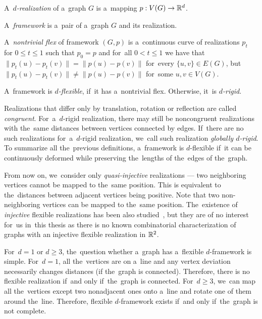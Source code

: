 %
\begin{definition}[\( d \)-realization]
	A~\emph{\( d \)-realization} of a~graph \( G \) is a~mapping \( p: V(G) \to \mathbb{R}^d \).
\end{definition}
%
\begin{definition}[Framework]
	A~\emph{framework} is a~pair of a~graph \( G \) and its realization.
\end{definition}
%
\begin{definition}
	A~\emph{nontrivial flex} of framework \( (G, p) \) is a~continuous curve of realizations \( p_t \)
	for \( 0 \le t \le 1\) such that
	\( p_0 = p \) and for~all \( 0 < t \le 1 \)
	we have that
	\( \|p_t(u) - p_t(v)\| = \|p(u) - p(v)\|\) for~every \( \{u, v\} \in E(G) \),
	but \( \|p_t(u) - p_t(v)\| \ne \|p(u) - p(v)\| \) for~some \( u, v \in V (G) \).
\end{definition}
%
\begin{definition}
	A~framework is \emph{\( d \)-flexible}, if~it has a~nontrivial flex.
	Otherwise, it~is \emph{\( d \)-rigid}.
\end{definition}
%
Realizations that differ only by translation,
rotation or reflection are called \emph{congruent}.
%
For~a~\( d \)-rigid realization, there may still be noncongruent realizations
with the~same distances between vertices connected by edges.
%
If~there are no such realizations for~a~\( d \)-rigid realization,
we~call such realization \emph{globally \( d \)-rigid}.
To summarize all the~previous definitions,
a~framework is \( d \)-flexible if~it can be continuously deformed
while preserving the~lengths of the~edges of the~graph.

From now on, we~consider only \emph{quasi-injective} realizations ---
two neighboring vertices cannot be mapped to the~same position.
This is equivalent to the~distances between adjacent vertices being positive.
Note that two non-neighboring vertices can be mapped to the~same position.
The~existence of \emph{injective} flexible realizations
has been also studied~\cite{injective_realizations},
but they are of no interest for~us in~this thesis
as there is no known combinatorial characterization
of graphs with an injective flexible realization in \( \mathbb{R}^2 \).

For~\( d = 1 \) or \( d \ge 3 \),
the~question whether a~graph has a~flexible \( d \)-framework is simple.
%
For~\( d = 1 \), all the~vertices are on a~line
and any vertex deviation necessarily changes distances (if the~graph is connected).
Therefore, there is no flexible realization if~and only if~the~graph is connected.
%
For~\( d \ge 3 \), we~can map all the~vertices except two nonadjacent ones
onto a~line and rotate one of them around the~line.
Therefore, flexible \( d \)-framework exists if~and only if~the~graph is not complete.

